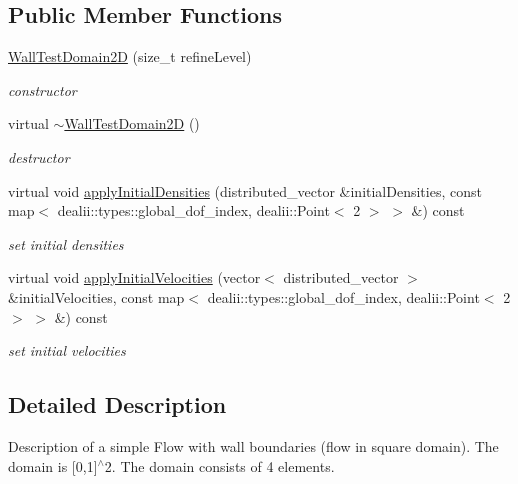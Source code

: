 \subsection*{Public Member Functions}
\begin{DoxyCompactItemize}
\item 
\hyperlink{classWallTestDomain2D_ae2a5588bd00b23f67587f5030520daca}{WallTestDomain2D} (size\_\-t refineLevel)
\begin{DoxyCompactList}\small\item\em constructor \item\end{DoxyCompactList}\item 
\hypertarget{classWallTestDomain2D_af086a6015fed51c4e1bd14e39fa52971}{
virtual \hyperlink{classWallTestDomain2D_af086a6015fed51c4e1bd14e39fa52971}{$\sim$WallTestDomain2D} ()}
\label{classWallTestDomain2D_af086a6015fed51c4e1bd14e39fa52971}

\begin{DoxyCompactList}\small\item\em destructor \item\end{DoxyCompactList}\item 
virtual void \hyperlink{classWallTestDomain2D_af8d57a6c29029514a2f2d09547f7fba1}{applyInitialDensities} (distributed\_\-vector \&initialDensities, const map$<$ dealii::types::global\_\-dof\_\-index, dealii::Point$<$ 2 $>$ $>$ \&) const 
\begin{DoxyCompactList}\small\item\em set initial densities \item\end{DoxyCompactList}\item 
virtual void \hyperlink{classWallTestDomain2D_ad2f712c227bc9ada17002006e90de3a1}{applyInitialVelocities} (vector$<$ distributed\_\-vector $>$ \&initialVelocities, const map$<$ dealii::types::global\_\-dof\_\-index, dealii::Point$<$ 2 $>$ $>$ \&) const 
\begin{DoxyCompactList}\small\item\em set initial velocities \item\end{DoxyCompactList}\end{DoxyCompactItemize}


\subsection{Detailed Description}
Description of a simple Flow with wall boundaries (flow in square domain). The domain is \mbox{[}0,1\mbox{]}$^\wedge$2. The domain consists of 4 elements. 

